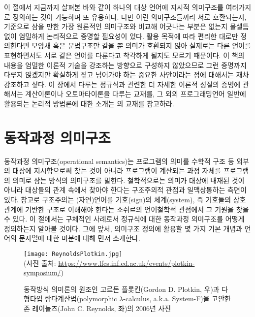이 절에서 지금까지 살펴본 바와 같이 하나의 대상 언어에 지시적 의미구조를
여러가지로 정의하는 것이 가능하며 또 유용하다. 다만 이런 의미구조들끼리
서로 호환되는지, 기준으로 삼을 만한 가장 원론적인 의미구조와 비교해
어긋나는 부분은 없는지 물샐틈없이 엄밀하게 논리적으로 증명할 필요성이 있다.
활용 목적에 따라 편리한 대로만 정의한다면 모양새 혹은
문법구조만 같을 뿐 의미가 호환되지 않아 실제로는 다른 언어를 표현하면서도
서로 같은 언어를 다룬다고 착각하게 될지도 모르기 때문이다. 이 책의 내용을
엄밀한 이론적 기술을 강조하는 방향으로 구성하지 않았으므로 그런 증명까지
다루지 않겠지만 확실하게 짚고 넘어가야 하는 중요한 사안이라는 점에 대해서는
재차 강조하고 싶다. 이 장에서 다루는 정규식과 관련한 더 자세한 이론적
성질의 증명에 관해서는 계산이론이나 오토마타이론을 다루는
교재\cite{Sipser2013,Hopcroft2007}를, 그 외의 프로그래밍언어 일반에
활용되는 논리적 방법론에 대한 소개는 \citet{PFPL2nd}의 교재를 참고하라.


\section{동작과정 의미구조}
동작과정 의미구조(operational semantics)\cite{Plotkin1981sos}는
프로그램의 의미를 수학적 구조 등 외부의 대상에 지시함으로써 찾는 것이
아니라 프로그램이 계산되는 과정 자체를 프로그램의 의미로 삼는 방식의
의미구조를 말한다. 철학적으로는 의미가 대상에 내재된 것이 아니라 대상들의
관계 속에서 찾아야 한다는 구조주의적 관점과 일맥상통하는 측면이 있다.
참고로 구조주의는 (자연)언어를 기호(sign)의 체계(system), 즉 기호들의
상호관계에 기반한 구조로 이해해야 한다는 소쉬르\cite{Saussure1916}의
언어철학적 관점에서 그 기원을 찾을 수 있다. 이 절에서는 구체적인
사례로서 정규식에 대한 동작과정 의미구조를 어떻게 정의하는지 알아볼
것이다. 그에 앞서, 의미구조 정의에 활용할 몇 가지 기본 개념과
언어의 문자열에 대한 미분에 대해 먼저 소개한다.

\begin{figure}\centering
\texttt{[image: ReynoldsPlotkin.jpg]}\\
{\footnotesize(사진 출처:
\url{https://www.lfcs.inf.ed.ac.uk/events/plotkin-symposium/})}
\caption{동작방식 의미론의 원조인 고르돈 플롯킨(Gordon D. Plotkin, 우)과
다형타입 람다계산법(polymorphic $\lambda$-calculus, a.k.a. System-F)을
고안한 존 레이놀즈(John C. Reynolds, 좌)의 2006년 사진}
\end{figure}

